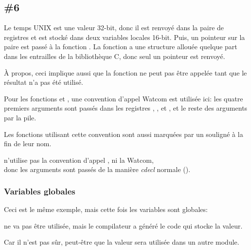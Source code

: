 \subsection{\Example{} \#6}






Le temps UNIX est une valeur 32-bit, donc il est renvoyé dans la paire de registres
 et est stocké dans deux variables locales 16-bit.
Puis, un pointeur sur la paire est passé à la fonction .
La fonction  a une structure  allouée quelque part
dans les entrailles de la bibliothèque C, donc seul un pointeur est renvoyé.

À propos, ceci implique aussi que la fonction ne peut pas être appelée tant que le
résultat n'a pas été utilisé.

Pour les fonctions  et , une convention d'appel Watcom
est utilisée ici:
les quatre premiers arguments sont passés dans les registres , , 
et , et le reste des arguments par la pile.

Les fonctions utilisant cette convention sont aussi marquées par un souligné à la
fin de leur nom.

 n'utilise pas la convention d'appel , ni la Watcom,\\ %
donc les arguments sont passés de la manière \emph{cdecl} normale ().

\subsubsection{Variables globales}

Ceci est le même exemple, mais cette fois les variables sont globales:





 ne va pas être utilisée, mais le compilateur a généré le code qui stocke
la valeur.

Car il n'est pas sûr, peut-être que la valeur sera utilisée dans un autre module.
